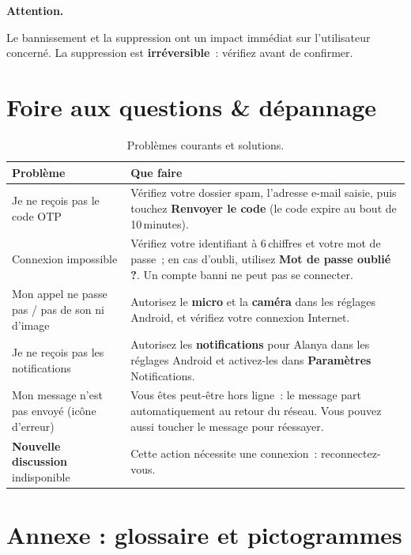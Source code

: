 \documentclass[11pt,a4paper,oneside]{report}
\newcommand{\bouton}[1]{\textbf{\textsf{#1}}}
\newcommand{\champ}[1]{\og{}#1\fg{}}
\newcommand{\thd}[1]{\textbf{\textcolor{AlanyaIndigoDark}{#1}}}
\newenvironment{attention}{%
  \begin{tcolorbox}[enhanced, frame hidden, interior hidden,
    borderline west={3pt}{0pt}{AlanyaAmber}, left=10pt, top=3pt, bottom=3pt,
    sharp corners, colback=white, before skip=\medskipamount, after skip=\medskipamount]%
  \small\textbf{\textcolor{AlanyaAmber}{Attention.}}\space\ignorespaces
}{\end{tcolorbox}}
\begin{document}
\begin{attention}
Le bannissement et la suppression ont un impact imm\'{e}diat sur l'utilisateur
concern\'{e}. La suppression est \textbf{irr\'{e}versible}~: v\'{e}rifiez avant de confirmer.
\end{attention}

\chapter{Foire aux questions \& d\'{e}pannage}
\label{chap:faq}

\begin{table}[H]
\centering\small
\begin{tabularx}{\linewidth}{@{}p{5.4cm} X@{}}
\toprule
\thd{Probl\`{e}me} & \thd{Que faire}\\
\midrule
Je ne re\c{c}ois pas le code OTP & V\'{e}rifiez votre dossier \og{}spam\fg{}, l'adresse e-mail saisie, puis touchez \bouton{Renvoyer le code} (le code expire au bout de 10\,minutes).\\
Connexion impossible & V\'{e}rifiez votre identifiant \`{a} 6\,chiffres et votre mot de passe~; en cas d'oubli, utilisez \bouton{Mot de passe oubli\'{e} ?}. Un compte banni ne peut pas se connecter.\\
Mon appel ne passe pas / pas de son ni d'image & Autorisez le \textbf{micro} et la \textbf{cam\'{e}ra} dans les r\'{e}glages Android, et v\'{e}rifiez votre connexion Internet.\\
Je ne re\c{c}ois pas les notifications & Autorisez les \textbf{notifications} pour Alanya dans les r\'{e}glages Android et activez-les dans \bouton{Param\`{e}tres} \textrightarrow{} \champ{Notifications}.\\
Mon message n'est pas envoy\'{e} (ic\^{o}ne d'erreur) & Vous \^{e}tes peut-\^{e}tre hors ligne~: le message part automatiquement au retour du r\'{e}seau. Vous pouvez aussi toucher le message pour r\'{e}essayer.\\
\bouton{Nouvelle discussion} indisponible & Cette action n\'{e}cessite une connexion~: reconnectez-vous.\\
\bottomrule
\end{tabularx}
\caption{Probl\`{e}mes courants et solutions.}
\end{table}

\appendix
\chapter{Annexe : glossaire et pictogrammes}
\end{document}
